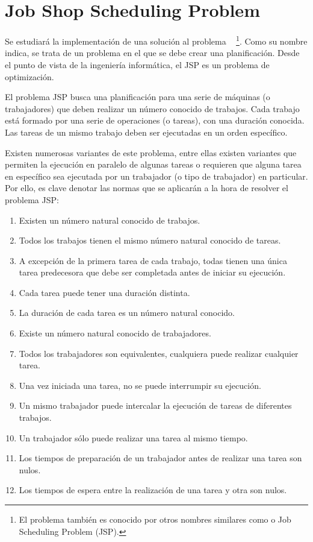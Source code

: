 
\section{Job Shop Scheduling Problem}

Se estudiará la implementación de una solución al problema
~\cite{Yan77}
\footnote{El problema también es conocido por otros nombres similares
como  o Job Scheduling Problem (JSP).}.
Como su nombre indica, se trata de un problema en el que se debe
crear una planificación.
Desde el punto de vista de la ingeniería informática,
el JSP es un problema de optimización.

El problema JSP busca una planificación para una serie de
máquinas (o trabajadores) que deben realizar un número conocido
de trabajos.
Cada trabajo está formado por una serie de operaciones (o tareas),
con una duración conocida.
Las tareas de un mismo trabajo deben ser ejecutadas en un orden específico.

Existen numerosas variantes de este problema,
entre ellas existen variantes que permiten la ejecución
en paralelo de algunas tareas o requieren que alguna tarea
en específico sea ejecutada por un trabajador (o tipo de trabajador)
en particular.
Por ello, es clave denotar las normas que se aplicarán a la hora de resolver
el problema JSP\@:

\begin{enumerate}[itemsep=0.25px]
    \item Existen un número natural conocido de trabajos.
    \item Todos los trabajos tienen el mismo número natural conocido de tareas.
    \item A excepción de la primera tarea de cada trabajo,
    todas tienen una única tarea predecesora que debe ser completada
    antes de iniciar su ejecución.
    \item Cada tarea puede tener una duración distinta.
    \item La duración de cada tarea es un número natural conocido.
    \item Existe un número natural conocido de trabajadores.
    \item Todos los trabajadores son equivalentes,
    cualquiera puede realizar cualquier tarea.
    \item Una vez iniciada una tarea, no se puede interrumpir su ejecución.
    \item Un mismo trabajador puede intercalar la ejecución de tareas de diferentes trabajos.
    \item Un trabajador sólo puede realizar una tarea al mismo tiempo.
    \item Los tiempos de preparación de un trabajador antes de realizar una tarea son nulos.
    \item Los tiempos de espera entre la realización de una tarea y otra son nulos.
\end{enumerate}

